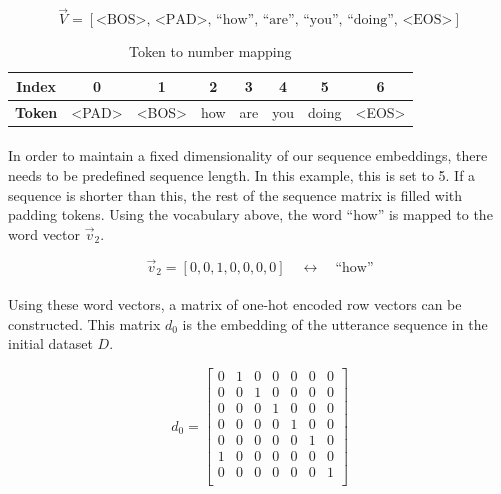 \documentclass{article}
\begin{document}
\begin{equation}
   \vec{V} = [ \textrm{<BOS>},\, \textrm{<PAD>},\, \textrm{``how''},\,
               \textrm{``are''},\, \textrm{``you''},\, \textrm{``doing''},\,
               \textrm{<EOS>}]
 \end{equation}

\begin{table}[hbt]
  \begin{center}
    \begin{tabular}{c|c|c|c|c|c|c|c}
      \textbf{Index} & 0 & 1 & 2 & 3 & 4 & 5 & 6 \\
      \hline
      \textbf{Token} & <PAD> & <BOS> & how & are & you & doing & <EOS> \\
    \end{tabular}
  \end{center}
  \label{tab:tok2num}
  \caption{Token to number mapping}
\end{table}

\paragraph{}
In order to maintain a fixed dimensionality of our sequence embeddings, there
needs to be predefined sequence length. In this example, this is set to 5. If a
sequence is shorter than this, the rest of the sequence matrix is filled with
padding tokens. Using the vocabulary above, the word ``how'' is mapped to the
word vector $\vec{v}_2$.

\begin{equation}
  \vec{v}_2 = [0, 0, 1, 0, 0, 0, 0] \quad {\leftrightarrow} \quad \textrm{``how''}
\end{equation}

\paragraph{}
Using these word vectors, a matrix of one-hot encoded row vectors can be
constructed. This matrix $d_0$ is the embedding of the utterance sequence
in the initial dataset $D$.  

\begin{equation}
  d_{0} = 
    \begin{bmatrix}
      0 & 1 & 0 & 0 & 0 & 0 & 0\\
      0 & 0 & 1 & 0 & 0 & 0 & 0\\
      0 & 0 & 0 & 1 & 0 & 0 & 0\\
      0 & 0 & 0 & 0 & 1 & 0 & 0\\
      0 & 0 & 0 & 0 & 0 & 1 & 0\\
      1 & 0 & 0 & 0 & 0 & 0 & 0\\
      0 & 0 & 0 & 0 & 0 & 0 & 1\\
    \end{bmatrix}
\end{equation}
\end{document}
